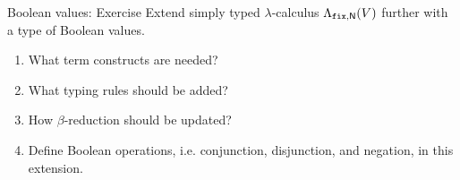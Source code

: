 \begin{frame}{Boolean values: Exercise}
  Extend simply typed $\lambda$-calculus $\Lambda_{\mathtt{fix}, \mathsf{N}}(V)$ further with a type of Boolean values. 
  \begin{enumerate}
    \item What term constructs are needed?
    \item What typing rules should be added?
    \item How $\beta$-reduction should be updated?
    \item Define Boolean operations, i.e. conjunction, disjunction, and negation, in this extension.
  \end{enumerate}

\end{frame}
